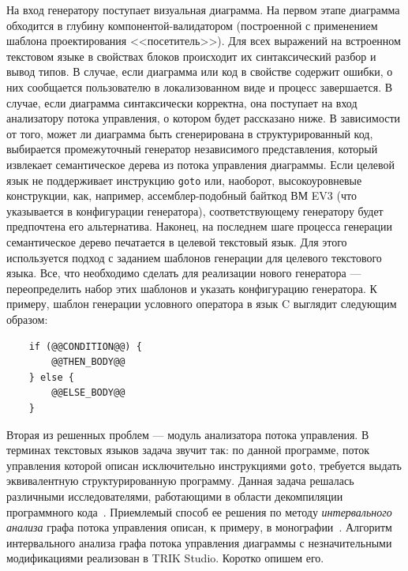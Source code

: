 \documentclass[conference]{IEEEtran}
\begin{document}
На вход генератору поступает визуальная диаграмма. На первом этапе диаграмма обходится в глубину компонентой-валидатором (построенной с применением шаблона проектирования <<посетитель>>). Для всех выражений на встроенном текстовом языке в свойствах блоков происходит их синтаксический разбор и вывод типов. В случае, если диаграмма или код в свойстве содержит ошибки, о них сообщается пользователю в локализованном виде и процесс завершается. В случае, если диаграмма синтаксически корректна, она поступает на вход анализатору потока управления, о котором будет рассказано ниже. В зависимости от того, может ли диаграмма быть сгенерирована в структурированный код, выбирается промежуточный генератор независимого представления, который извлекает семантическое дерева из потока управления диаграммы. Если целевой язык не поддерживает инструкцию \texttt{goto} или, наоборот, высокоуровневые конструкции, как, например, ассемблер-подобный байткод ВМ EV3 (что указывается в конфигурации генератора), соответствующему генератору будет предпочтена его альтернатива. Наконец, на последнем шаге процесса генерации семантическое дерево печатается в целевой текстовый язык. Для этого используется подход с заданием шаблонов генерации для целевого текстового языка. Все, что необходимо сделать для реализации нового генератора --- переопределить набор этих шаблонов и указать конфигурацию генератора. К примеру, шаблон генерации условного оператора в язык C выглядит следующим образом: \begin{verbatim}
    if (@@CONDITION@@) {
        @@THEN_BODY@@
    } else {
        @@ELSE_BODY@@
    }
\end{verbatim}

Вторая из решенных проблем --- модуль анализатора потока управления. В терминах текстовых языков задача звучит так: по данной программе, поток управления которой описан исключительно инструкциями \texttt{goto}, требуется выдать эквивалентную структурированную программу. Данная задача решалась различными исследователями, работающими в области декомпиляции программного кода~\cite{steven1997advanced,деревенец2009структурный}. Приемлемый способ ее решения по методу \textit{интервального анализа} графа потока управления описан, к примеру, в монографии~\cite{steven1997advanced}. Алгоритм интервального анализа графа потока управления диаграммы с незначительными модификациями реализован в TRIK Studio. Коротко опишем его.
\end{document}
